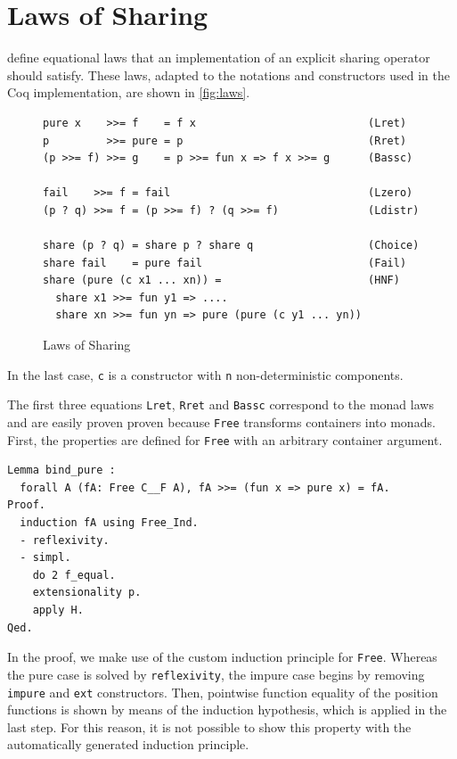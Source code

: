 \documentclass[a4paper, 11pt, fleqn, twoside, abstract=on]{scrreprt}
\newcommand{\cinl}[1]{\texttt{#1}}
\begin{document}
\section{Laws of Sharing}
\citet{fischer2009purely} define equational laws that an implementation of an explicit sharing operator should satisfy.
These laws, adapted to the notations and constructors used in the Coq implementation, are shown in \autoref{fig:laws}.

\begin{figure}[H]
\begin{verbatim}
pure x    >>= f    = f x                           (Lret)
p         >>= pure = p                             (Rret)
(p >>= f) >>= g    = p >>= fun x => f x >>= g      (Bassc)

fail    >>= f = fail                               (Lzero)
(p ? q) >>= f = (p >>= f) ? (q >>= f)              (Ldistr)

share (p ? q) = share p ? share q                  (Choice)
share fail    = pure fail                          (Fail)
share (pure (c x1 ... xn)) =                       (HNF)
  share x1 >>= fun y1 => ....
  share xn >>= fun yn => pure (pure (c y1 ... yn))
\end{verbatim}
\caption{Laws of Sharing}
\label{fig:laws}
\end{figure}

In the last case, \cinl{c} is a constructor with \cinl{n} non-deterministic components.

The first three equations \cinl{Lret}, \cinl{Rret} and \cinl{Bassc} correspond to the monad laws and are easily proven proven because \cinl{Free} transforms containers into monads.
First, the properties are defined for \cinl{Free} with an arbitrary container argument.

\begin{verbatim}
Lemma bind_pure :
  forall A (fA: Free C__F A), fA >>= (fun x => pure x) = fA.
Proof.
  induction fA using Free_Ind.
  - reflexivity.
  - simpl.
    do 2 f_equal.
    extensionality p.
    apply H.
Qed.
\end{verbatim}

In the proof, we make use of the custom induction principle for \cinl{Free}.
Whereas the pure case is solved by \cinl{reflexivity}, the impure case begins by removing \cinl{impure} and \cinl{ext} constructors.
Then, pointwise function equality of the position functions is shown by means of the induction hypothesis, which is applied in the last step.
For this reason, it is not possible to show this property with the automatically generated induction principle.
\end{document}

